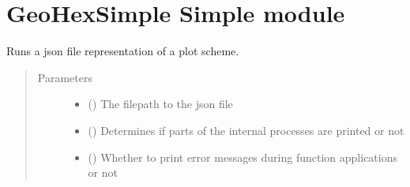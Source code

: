 \documentclass[letterpaper,10pt,english]{sphinxmanual}
\begin{document}
\chapter{GeoHexSimple \sphinxhyphen{} Simple module}
\label{\detokenize{simple:module-scripts.geohexsimple.simple}}\label{\detokenize{simple:geohexsimple-simple-module}}\label{\detokenize{simple::doc}}

\begin{fulllineitems}
\label{\detokenize{simple:scripts.geohexsimple.simple.run_json}}
\sphinxAtStartPar
Runs a json file representation of a plot scheme.
\begin{quote}\begin{description}
\item[{Parameters}] \leavevmode\begin{itemize}
\item {} 
\sphinxAtStartPar
{} () \textendash{} The filepath to the json file

\item {} 
\sphinxAtStartPar
{} () \textendash{} Determines if parts of the internal processes are printed or not

\item {} 
\sphinxAtStartPar
{} () \textendash{} Whether to print error messages during function applications or not

\end{itemize}

\end{description}\end{quote}

\end{fulllineitems}
\end{document}
